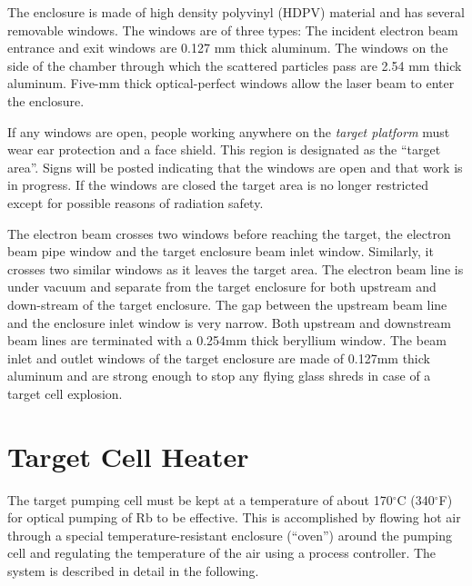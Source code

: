 The enclosure is made of high density polyvinyl (HDPV) material and has 
several removable
windows.  The windows are of three types: The incident electron beam
entrance and exit windows are 0.127 mm thick aluminum.
The windows on the side of the chamber through which the scattered 
particles pass are 2.54 mm thick aluminum. Five-mm thick optical-perfect
windows allow the laser beam to enter the enclosure.

\begin{safetyen}{10}{5}
If any windows are open, people working anywhere on the {\em target
platform} must wear ear protection and a face shield. This region is
designated as the ``target area''.  Signs will be posted indicating
that the windows are open and that work is in progress. If the windows
are closed the target area is no longer restricted except for possible
reasons of radiation safety.
\end{safetyen}

The electron beam crosses two windows before reaching the target, the
electron beam pipe window and the target enclosure beam inlet
window. Similarly, it crosses two similar windows as it leaves the
target area. The electron beam line is under vacuum and separate from
the target enclosure for both upstream and down-stream of the target
enclosure. The gap between the upstream beam line and the enclosure
inlet window is very narrow. Both upstream and downstream beam lines
are terminated with a 0.254mm thick beryllium window.  The beam inlet
and outlet windows of the target enclosure are made of 0.127mm thick
aluminum and are strong enough to stop any flying glass shreds in case
of a target cell explosion.

\section{Target Cell Heater}
\label{sec:tgtheater}

The target pumping cell must be kept at a temperature of about
170$^\circ$C (340$^\circ$F) for optical pumping of Rb to be
effective. This is accomplished by flowing hot air through a special
temperature-resistant enclosure (``oven'') around the pumping cell 
and regulating the temperature of the air using a process
controller. The system is described in detail in the following.

